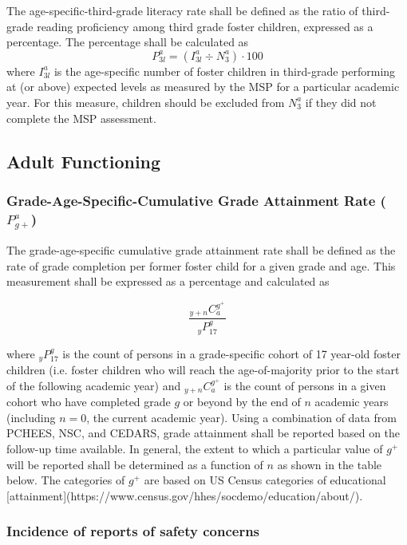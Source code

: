 \documentclass[12pt]{article}\usepackage[]{graphicx}\usepackage[]{color}
\begin{document}
The age-specific-third-grade literacy rate shall be defined as the ratio of third-grade reading proficiency among third grade foster children, expressed as a percentage. The percentage shall be calculated as 
$$
P_{3l}^a= (I_{3l}^a \div N_3^a) \cdot 100
$$
where $I_{3l}^a$ is the age-specific number of foster children in third-grade performing at (or above) expected levels as measured by the MSP for a particular academic year. For this measure, children should be excluded from $N_3^a$ if they did not complete the MSP assessment. 


\subsection{Adult Functioning}

\subsubsection{Grade-Age-Specific-Cumulative Grade Attainment Rate ($P_{g+}^a$)}

The grade-age-specific cumulative grade attainment rate shall be defined as the rate of grade completion per former foster child for a given grade and age. This measurement shall be expressed as a percentage and calculated as

$$
\frac{{}_{y+n}C^{g^+}_a}{{}_{y}P^{g}_{17}}
$$

where ${}_{y}P^{g}_{17}$ is the count of persons in a grade-specific cohort of 17 year-old foster children (i.e. foster children who will reach the age-of-majority prior to the start of the following academic year) and ${}_{y+n}C^{g^+}_a$ is the count of persons in a given cohort who have completed grade $g$ or beyond by the end of $n$ academic years (including $n=0$, the current academic year). Using a combination of data from PCHEES, NSC, and CEDARS, grade attainment shall be reported based on the follow-up time available. In general, the extent to which a particular value of $g^+$ will be reported shall be determined as a function of $n$ as shown in the table below. The categories of $g^+$ are based on US Census categories of educational [attainment](https://www.census.gov/hhes/socdemo/education/about/). 





\subsubsection{Incidence of reports of safety concerns}
\end{document}
